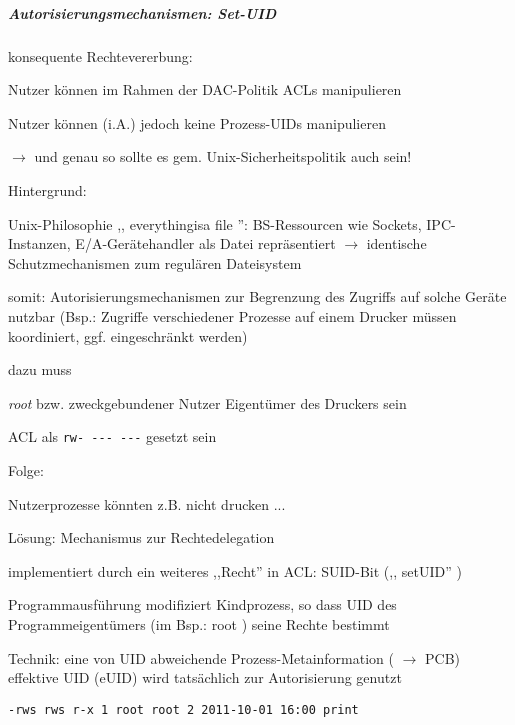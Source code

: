 \documentclass[a4paper]{article}
\begin{document}
\begin{multicols}{3}
    \subparagraph{Autorisierungsmechanismen:
        Set-UID}

    konsequente Rechtevererbung:

    \begin{itemize*}
        \item
        Nutzer können im Rahmen der DAC-Politik ACLs manipulieren
        \item
        Nutzer können (i.A.) jedoch keine Prozess-UIDs manipulieren
        \item
        $\rightarrow$ und genau so sollte es gem.
        Unix-Sicherheitspolitik auch sein!
    \end{itemize*}

    Hintergrund:

    \begin{itemize*}
        \item
        Unix-Philosophie ,, everythingisa file '': BS-Ressourcen wie Sockets,
        IPC-Instanzen, E/A-Gerätehandler als Datei repräsentiert
        $\rightarrow$ identische Schutzmechanismen zum
        regulären Dateisystem
        \item
        somit: Autorisierungsmechanismen zur Begrenzung des Zugriffs auf
        solche Geräte nutzbar (Bsp.: Zugriffe verschiedener Prozesse auf einem
        Drucker müssen koordiniert, ggf. eingeschränkt werden)
        \item
        dazu muss
        \begin{itemize*}
            \item \emph{root} bzw. zweckgebundener Nutzer Eigentümer des Druckers sein
            \item ACL als \texttt{rw-\ -\/-\/-\ -\/-\/-} gesetzt sein
        \end{itemize*}
    \end{itemize*}

    Folge:

    \begin{itemize*}
        \item
        Nutzerprozesse könnten z.B. nicht drucken ...
    \end{itemize*}

    Lösung: Mechanismus zur Rechtedelegation

    \begin{itemize*}
        \item
        implementiert durch ein weiteres ,,Recht'' in ACL: SUID-Bit (,,
        setUID'' )
        \item
        Programmausführung modifiziert Kindprozess, so dass UID des
        Programmeigentümers (im Bsp.: root ) seine Rechte bestimmt
        \item
        Technik: eine von UID abweichende Prozess-Metainformation
        ( $\rightarrow$ PCB) effektive UID (eUID) wird
        tatsächlich zur Autorisierung genutzt
        \item
        \texttt{-rws\ rws\ r-x\ 1\ root\ root\ 2\ 2011-10-01\ 16:00\ print}
    \end{itemize*}


\end{multicols}
\end{document}
